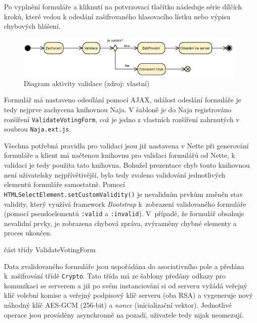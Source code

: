 Po vyplnění formuláře a kliknutí na potvrzovací tlačítko následuje série dílčích kroků, které vedou k odeslání zašifrovaného hlasovacího lístku nebo výpisu chybových hlášení.

\begin{figure}[h]
	\centering
	\includegraphics[width=\linewidth]{svg/validace.eps}
	\captionsetup{width=\linewidth}
	\caption[Diagram aktivity validace]{Diagram aktivity validace (zdroj: vlastní)}
	\label{fig:diagramValidace}
\end{figure}

Formulář má nastaveno odesílání pomocí AJAX, událost odeslání formuláře je tedy nejprve zachycena knihovnou Naja. V šabloně je do Naja registrováno rozšíření \texttt{ValidateVotingForm}, což je jedno z vlastních rozšíření zahrnutých v soubrou \texttt{Naja.ext.js}.

Všechna potřebná pravidla pro validaci jsou již nastavena v Nette při generování formuláře a klient má načtenou knihovnu pro validaci formulářů od Nette, k validaci je tedy použita tato knihovna. Bohužel prezentace chyb touto knihovnou není uživatelsky nejpřívětivější, bylo tedy zvoleno validování jednotlivých elementů formuláře samostatně. Pomocí \texttt{HTMLSelectElement.setCustomValidity()} je nevalidním prvkům změněn stav validity, který využívá framework \textit{Bootstrap} \cite{Bootstrap} k~zobrazení validovaného formuláře (pomocí pseudoelementů \texttt{:valid} a \texttt{:invalid}). V~případě, že formulář obsahuje nevalidní prvky, je zobrazena chybová zpráva, zvýrazněny chybné elementy a proces ukončen.

\begin{listing}[ht]
\caption{část třídy ValidateVotingForm}
\label{php:validace}
\end{listing}

Data zvalidovaného formuláře jsou uspořádána do asociativního pole a předána k~zašifrování třídě \texttt{Crypto}. Tato třída má ze šablony předány odkazy pro komunikaci se serverem a již po svém instanciování si od serveru vyžádá veřejný klíč volební komise a veřejný podpisový klíč serveru (oba RSA) a vygeneruje nový náhodný klíč AES-GCM (256-bit) a \textit{nonce} (inicializační vektor). Jednotlivé operace jsou prováděny asynchronně na pozadí, uživatele tedy nijak neomezují.

